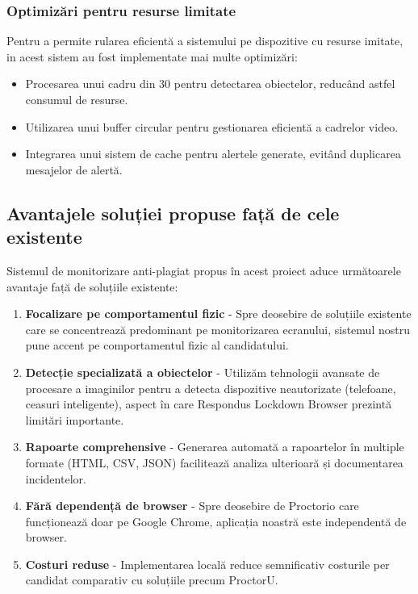 \documentclass[12pt,a4paper]{article}
\begin{document}
\subsubsection{Optimizări pentru resurse limitate}
Pentru a permite rularea eficientă a sistemului pe dispozitive cu resurse imitate, in acest sistem au fost implementate mai multe optimizări:
\begin{itemize}
    \item Procesarea unui cadru din 30 pentru detectarea obiectelor, reducând astfel consumul de resurse.
    \item Utilizarea unui buffer circular pentru gestionarea eficientă a cadrelor video.
    \item Integrarea unui sistem de cache pentru alertele generate, evitând duplicarea mesajelor de alertă.
\end{itemize}

\subsection{Avantajele soluției propuse față de cele existente}

Sistemul de monitorizare anti-plagiat propus în acest proiect aduce următoarele avantaje față de soluțiile existente:

\begin{enumerate}
    \item \textbf{Focalizare pe comportamentul fizic} - Spre deosebire de soluțiile existente care se concentrează predominant pe monitorizarea ecranului, sistemul nostru pune accent pe comportamentul fizic al candidatului.
    
    \item \textbf{Detecție specializată a obiectelor} - Utilizăm tehnologii avansate de procesare a imaginilor pentru a detecta dispozitive neautorizate (telefoane, ceasuri inteligente), aspect în care Respondus Lockdown Browser prezintă limitări importante.
    
    \item \textbf{Rapoarte comprehensive} - Generarea automată a rapoartelor în multiple formate (HTML, CSV, JSON) facilitează analiza ulterioară și documentarea incidentelor.
    
    \item \textbf{Fără dependență de browser} - Spre deosebire de Proctorio care funcționează doar pe Google Chrome, aplicația noastră este independentă de browser.
    
    \item \textbf{Costuri reduse} - Implementarea locală reduce semnificativ costurile per candidat comparativ cu soluțiile precum ProctorU.
\end{enumerate}
\end{document}
